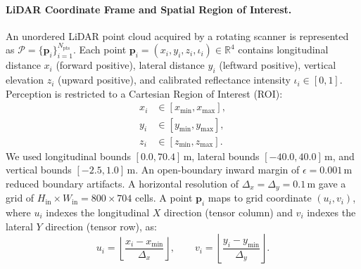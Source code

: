 \paragraph{LiDAR Coordinate Frame and Spatial Region of Interest.}
An unordered LiDAR point cloud acquired by a rotating scanner is represented as $\mathcal{P} = \{\mathbf{p}_i\}_{i=1}^{N_{\mathrm{pts}}}$. Each point $\mathbf{p}_i = (x_i, y_i, z_i, \iota_i) \in \mathbb{R}^4$ contains longitudinal distance $x_i$ (forward positive), lateral distance $y_i$ (leftward positive), vertical elevation $z_i$ (upward positive), and calibrated reflectance intensity $\iota_i \in [0, 1]$. Perception is restricted to a Cartesian Region of Interest (ROI):
\begin{equation}
    \begin{aligned}
        x_i &\in [x_{\min}, x_{\max}], \\
        y_i &\in [y_{\min}, y_{\max}], \\  z_i &\in [z_{\min}, z_{\max}].
    \end{aligned}
    \label{eq:spatial_roi}
\end{equation}
We used longitudinal bounds $[0.0, 70.4]$\,m, lateral bounds $[-40.0, 40.0]$\,m, and vertical bounds $[-2.5, 1.0]$\,m. An open-boundary inward margin of $\epsilon = 0.001$\,m reduced boundary artifacts. A horizontal resolution of $\Delta_x = \Delta_y = 0.1$\,m gave a grid of $H_{\mathrm{in}} \times W_{\mathrm{in}} = 800 \times 704$ cells. A point $\mathbf{p}_i$ maps to grid coordinate $(u_i, v_i)$, where $u_i$ indexes the longitudinal $X$ direction (tensor column) and $v_i$ indexes the lateral $Y$ direction (tensor row), as:
\begin{equation}
    u_i = \left\lfloor \frac{x_i - x_{\min}}{\Delta_x} \right\rfloor, \qquad v_i = \left\lfloor \frac{y_i - y_{\min}}{\Delta_y} \right\rfloor.
    \label{eq:grid_assignment}
\end{equation}


